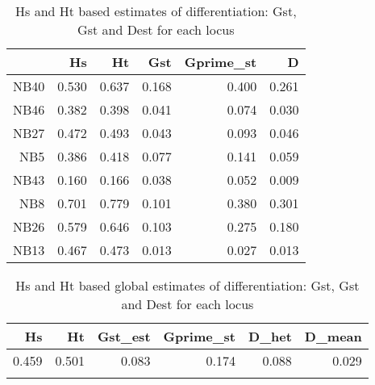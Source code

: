 \documentclass[a4paper]{scrartcl}\usepackage[]{graphicx}\usepackage[]{color}
\begin{document}
\begin{table}[ht]
\centering
\begin{tabular}{rrrrrr}
  \hline
 & Hs & Ht & Gst & Gprime\_st & D \\ 
  \hline
NB40 & 0.530 & 0.637 & 0.168 & 0.400 & 0.261 \\ 
   \rowcolor[gray]{0.9} NB46 & 0.382 & 0.398 & 0.041 & 0.074 & 0.030 \\ 
  NB27 & 0.472 & 0.493 & 0.043 & 0.093 & 0.046 \\ 
   \rowcolor[gray]{0.9} NB5 & 0.386 & 0.418 & 0.077 & 0.141 & 0.059 \\ 
  NB43 & 0.160 & 0.166 & 0.038 & 0.052 & 0.009 \\ 
   \rowcolor[gray]{0.9} NB8 & 0.701 & 0.779 & 0.101 & 0.380 & 0.301 \\ 
  NB26 & 0.579 & 0.646 & 0.103 & 0.275 & 0.180 \\ 
   \rowcolor[gray]{0.9} NB13 & 0.467 & 0.473 & 0.013 & 0.027 & 0.013 \\ 
   \hline
\end{tabular}
\caption{Hs and Ht based estimates of differentiation: Gst, Gst and Dest for each locus} 
\end{table}
\begin{table}[ht]
\centering
\begin{tabular}{rrrrrr}
  \hline
Hs & Ht & Gst\_est & Gprime\_st & D\_het & D\_mean \\ 
  \hline
0.459 & 0.501 & 0.083 & 0.174 & 0.088 & 0.029 \\ 
   \rowcolor[gray]{0.9}  \hline
\end{tabular}
\caption{Hs and Ht based global estimates of differentiation: Gst, Gst and Dest for each locus} 
\end{table}
\end{document}
